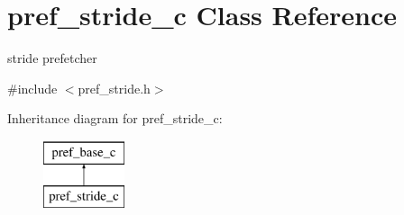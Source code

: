 \hypertarget{classpref__stride__c}{
\section{pref\_\-stride\_\-c Class Reference}
\label{classpref__stride__c}
}


stride prefetcher  




{\ttfamily \#include $<$pref\_\-stride.h$>$}

Inheritance diagram for pref\_\-stride\_\-c:\begin{figure}[H]
\begin{center}
\leavevmode
\includegraphics[height=2.000000cm]{classpref__stride__c}
\end{center}
\end{figure}
